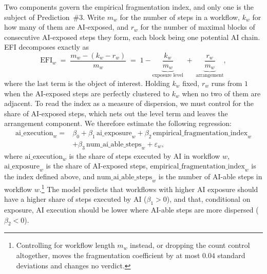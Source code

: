 Two components govern the empirical fragmentation index, and only one is the subject of Prediction~\#3.
Write $m_w$ for the number of steps in a workflow, $k_w$ for how many of them are AI-exposed, and $r_w$ for the number of maximal blocks of consecutive AI-exposed steps they form, each block being one potential AI chain.
EFI decomposes exactly as
\begin{equation}
    \text{EFI}_w \;=\; \frac{m_w - (k_w - r_w)}{m_w} \;=\; 1 - \underbrace{\frac{k_w}{m_w}}_{\text{exposure level}} \;+\; \underbrace{\frac{r_w}{m_w}}_{\text{arrangement}},
    \label{eq:efi_decomposition}
\end{equation}
where the last term is the object of interest.
Holding $k_w$ fixed, $r_w$ runs from $1$ when the AI-exposed steps are perfectly clustered to $k_w$ when no two of them are adjacent.
To read the index as a measure of dispersion, we must control for the share of AI-exposed steps, which nets out the level term and leaves the arrangement component.
We therefore estimate the following regression:
\begin{equation}
\begin{aligned}
    \text{ai\_execution}_{w} = {} & \beta_0 + \beta_1 \, \text{ai\_exposure}_{w} + \beta_2 \, \text{empirical\_fragmentation\_index}_{w} \\
    & + \beta_3 \, \text{num\_ai\_able\_steps}_{w} + \varepsilon_w,
\end{aligned}
    \label{eq:fragmentation_index_regression}
\end{equation}
where \emph{$\text{ai\_execution}_{w}$} is the share of steps executed by AI in workflow $w$, \emph{$\text{ai\_exposure}_{w}$} is the share of AI-exposed steps, \emph{$\text{empirical\_fragmentation\_index}_{w}$} is the index defined above, and \emph{$\text{num\_ai\_able\_steps}_{w}$} is the number of AI-able steps in workflow $w$.\footnote{Controlling for workflow length $m_w$ instead, or dropping the count control altogether, moves the fragmentation coefficient by at most $0.04$ standard deviations and changes no verdict.}
The model predicts that workflows with higher AI exposure should have a higher share of steps executed by AI ($\beta_1 > 0$), and that, conditional on exposure, AI execution should be lower where AI-able steps are more dispersed ($\beta_2 < 0$).


